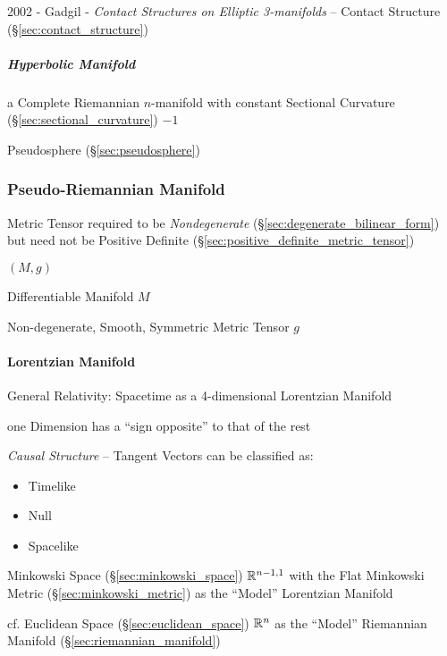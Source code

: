 2002 - Gadgil - \emph{Contact Structures on Elliptic 3-manifolds}
-- Contact Structure (\S\ref{sec:contact_structure})



\subparagraph{Hyperbolic Manifold}\label{sec:hyperbolic_manifold}\hfill

a Complete Riemannian $n$-manifold with constant Sectional Curvature
(\S\ref{sec:sectional_curvature}) $-1$

Pseudosphere (\S\ref{sec:pseudosphere})



\subsubsection{Pseudo-Riemannian Manifold}
\label{sec:pseudo_riemannian}

Metric Tensor required to be \emph{Nondegenerate}
(\S\ref{sec:degenerate_bilinear_form}) but need not be Positive
Definite (\S\ref{sec:positive_definite_metric_tensor})

$(M,g)$

Differentiable Manifold $M$

Non-degenerate, Smooth, Symmetric Metric Tensor $g$



\paragraph{Lorentzian Manifold}\label{sec:lorentzian_manifold}\hfill

General Relativity: Spacetime as a 4-dimensional Lorentzian Manifold

one Dimension has a ``sign opposite'' to that of the rest

\emph{Causal Structure} -- Tangent Vectors can be classified as:
\begin{itemize}
  \item Timelike
  \item Null
  \item Spacelike
\end{itemize}

Minkowski Space (\S\ref{sec:minkowski_space}) $\mathbb{R}^{n-1,1}$ with the Flat
Minkowski Metric (\S\ref{sec:minkowski_metric}) as the ``Model'' Lorentzian
Manifold

cf. Euclidean Space (\S\ref{sec:euclidean_space}) $\mathbb{R}^n$ as the ``Model''
Riemannian Manifold (\S\ref{sec:riemannian_manifold})



